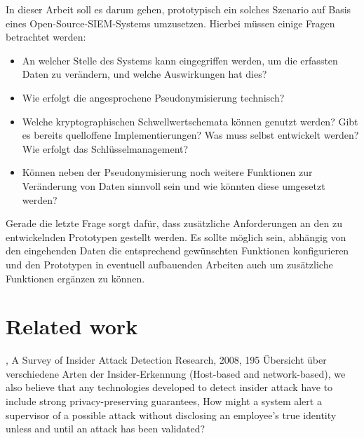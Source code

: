 


In dieser Arbeit soll es darum gehen, prototypisch ein solches Szenario auf Basis eines Open-Source-SIEM-Systems umzusetzen. 
Hierbei müssen einige Fragen betrachtet werden:

\begin{itemize}
\item An welcher Stelle des Systems kann eingegriffen werden, um die erfassten Daten zu verändern, und welche Auswirkungen hat dies?
\item Wie erfolgt die angesprochene Pseudonymisierung technisch?
\item Welche kryptographischen Schwellwertschemata können genutzt werden? Gibt es bereits quelloffene Implementierungen? Was muss selbst entwickelt werden? Wie erfolgt das Schlüsselmanagement?
\item Können neben der Pseudonymisierung noch weitere Funktionen zur Veränderung von Daten sinnvoll sein und wie könnten diese umgesetzt werden?
\end{itemize}

Gerade die letzte Frage sorgt dafür, dass zusätzliche Anforderungen an den zu entwickelnden Prototypen gestellt werden. Es sollte möglich sein, abhängig von den eingehenden Daten die entsprechend gewünschten Funktionen konfigurieren und den Prototypen in eventuell aufbauenden Arbeiten auch um zusätzliche Funktionen ergänzen zu können.



\section{Related work}

\cite{salem2008survey}, A Survey of Insider Attack Detection Research, 2008, 195
Übersicht über verschiedene Arten der Insider-Erkennung (Host-based and network-based), 
we also believe that any technologies developed to detect insider attack have to include strong privacy-preserving guarantees,
How might a system alert a supervisor of a possible attack without disclosing
an employee’s true identity unless and until an attack has been validated?



